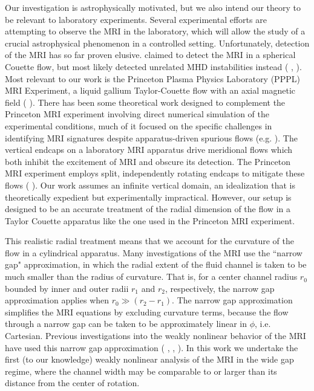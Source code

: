 \documentclass{emulateapj}
\newcommand{\citei}[1]{\citeauthor{#1} \citeyear{#1}}
\begin{document}
Our investigation is astrophysically motivated, but we also intend our theory to be relevant to laboratory experiments. Several experimental efforts are attempting to observe the MRI in the laboratory, which will allow the study of a crucial astrophysical phenomenon in a controlled setting. Unfortunately, detection of the MRI has so far proven elusive. \citei{Sisan:2004ig} claimed to detect the MRI in a spherical Couette flow, but most likely detected unrelated MHD instabilities instead (\citei{Hollerbach:2009ig}, \citei{Gissinger:2011td}). Most relevant to our work is the Princeton Plasma Physics Laboratory (PPPL) MRI Experiment, a liquid gallium Taylor-Couette flow with an axial magnetic field (\citei{Ji:2001kd}). There has been some theoretical work designed to complement the Princeton MRI experiment involving direct numerical simulation of the experimental conditions, much of it focused on the specific challenges in identifying MRI signatures despite apparatus-driven spurious flows (e.g. \citei{Gissinger:2012gc}). The vertical endcaps on a laboratory MRI apparatus drive meridional flows which both inhibit the excitement of MRI and obscure its detection. The Princeton MRI experiment employs split, independently rotating endcaps to mitigate these flows (\citei{Schartman:2009df}). Our work assumes an infinite vertical domain, an idealization that is theoretically expedient but experimentally impractical. However, our setup is designed to be an accurate treatment of the radial dimension of the flow in a Taylor Couette apparatus like the one used in the Princeton MRI experiment. 

This realistic radial treatment means that we account for the curvature of the flow in a cylindrical apparatus. Many investigations of the MRI use the ``narrow gap" approximation, in which the radial extent of the fluid channel is taken to be much smaller than the radius of curvature. That is, for a center channel radius $r_0$ bounded by inner and outer radii $r_1$ and $r_2$, respectively, the narrow gap approximation applies when $r_0 \gg (r_2 - r_1)$. The narrow gap approximation simplifies the MRI equations by excluding curvature terms, because the flow through a narrow gap can be taken to be approximately linear in $\phi$, i.e. Cartesian. Previous investigations into the weakly nonlinear behavior of the MRI have used this narrow gap approximation (\citei{Umurhan:2007dz}, \citei{Umurhan:2007hs}, \citei{Clark:2016}). In this work we undertake the first (to our knowledge) weakly nonlinear analysis of the MRI in the wide gap regime, where the channel width may be comparable to or larger than its distance from the center of rotation.
\end{document}

